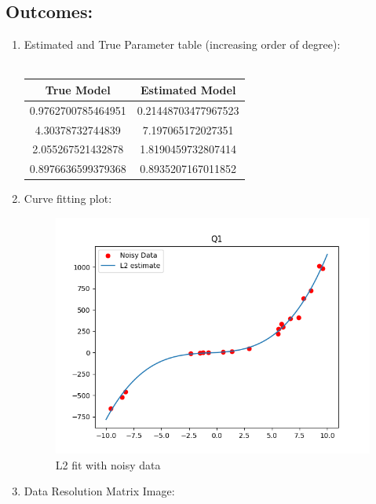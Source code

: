 \documentclass{article}
\begin{document}
\subsection{Outcomes:}
\begin{enumerate}
    \item Estimated and True Parameter table (increasing order of degree):\\
    \\
    \begin{tabular}{|c|c|} 
        \hline 
       True Model & Estimated Model\\ 
       \hline 
       0.9762700785464951 & 0.21448703477967523\\ 
       \hline 
       4.30378732744839 & 7.197065172027351\\ 
       \hline 
       2.055267521432878 & 1.8190459732807414\\ 
       \hline 
       0.8976636599379368 & 0.8935207167011852\\ 
       \hline 
    \end{tabular}
\clearpage
    \item Curve fitting plot:\\
    \begin{figure}[h]
        \centering
        \includegraphics[width = 15 cm]{figs/Q1plot.png}
        \caption{L2 fit with noisy data}
    \end{figure}
\clearpage
    \item Data Resolution Matrix Image:
    \begin{figure}[h]
        \centering

\end{figure}
\end{enumerate}
\end{document}
